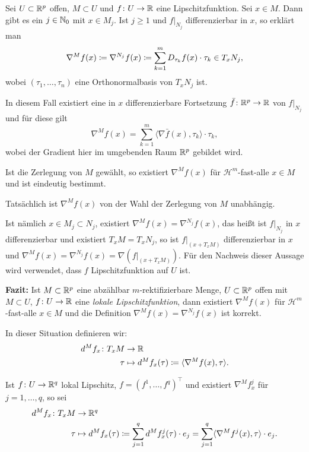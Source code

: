\documentclass[a4paper,twoside,DIV15,BCOR12mm]{scrbook}
\newcommand{\HM}{\mathscr H}
\begin{document}
Sei $U\subset\mathbb{R}^p$ offen, $M\subset U$ und $f\colon U\to \mathbb{R}$ eine Lipschitzfunktion. Sei $x\in M$. Dann gibt es ein $j\in\mathbb{N}_0$ mit $x\in M_j$. Ist $j\ge 1$ und $f|_{N_j}$ differenzierbar in $x$, so erklärt man
\[
\nabla^M f(x) \da \nabla^{N_j} f(x) \da \sum_{k=1}^m  D_{\tau_k}f(x) \cdot \tau_k  \in T_xN_j,
\]
wobei $(\tau_1,\ldots,\tau_n)$ eine Orthonormalbasis von $T_xN_j$ ist.

In diesem Fall existiert eine in $x$ differenzierbare Fortsetzung $\bar f\colon \mathbb{R}^p \to \mathbb{R}$ von $f|_{N_j}$ und für diese gilt 
\[
\nabla^M f(x) = \sum_{k=1}^m \langle \nabla\bar f(x), \tau_k\rangle \cdot \tau_k,
\]
wobei der Gradient hier im umgebenden Raum $\mathbb{R}^p$ gebildet wird.


\begin{bemerkungen}
\item Ist die Zerlegung von $M$ gewählt, so existiert $\nabla^Mf(x)$ für $\HM^m$-fast-alle $x\in M$ und ist eindeutig bestimmt.
\item Tatsächlich ist $\nabla^M f(x)$ von der Wahl der Zerlegung von $M$ unabhängig.

Ist nämlich $x\in M_j\subset N_j$, existiert $\nabla^M f(x) = \nabla^{N_j}f(x)$, das heißt ist $f|_{N_j}$ in $x$ differenzierbar und existiert $T_xM = T_xN_j$, so ist $f|_{(x+T_xM)}$ differenzierbar in $x$ und $\nabla^Mf(x) = \nabla^{N_j} f(x) = \nabla(f|_{(x+T_xM)})$. Für den Nachweis dieser Aussage wird verwendet, dass $f$ Lipschitzfunktion auf $U$ ist.
\end{bemerkungen}

\textbf{Fazit:} Ist $M\subset \mathbb{R}^p$ eine abzählbar $m$-rektifizierbare Menge, $U\subset\mathbb{R}^p$ offen mit $M\subset U$, $f\colon U\to \mathbb{R}$ eine {\em lokale Lipschitzfunktion}, dann existiert $\nabla^Mf(x)$ für $\HM^m$-fast-alle $x\in M$ und die Definition $\nabla^Mf(x) = \nabla^{N_j} f(x)$ ist korrekt. 

In dieser Situation definieren wir:
\begin{align*}
d^M f_x \colon T_xM &\to \MdR \\
\tau &\mapsto d^Mf_x(\tau) \da \langle \nabla^Mf(x), \tau\rangle.
\end{align*}

Ist $f\colon U\to\mathbb{R}^q$ lokal Lipschitz, $f=(f^1,\ldots,f^q)^\top$ und existiert $\nabla^Mf^j_x$ für $j=1,\ldots,q$, so sei 
\begin{align*}
d^M f_x \colon T_xM &\to \MdR^q \\
\tau &\mapsto d^Mf_x(\tau) \da \sum_{j=1}^q d^Mf^j_x(\tau) \cdot e_j = \sum_{j=1}^q \langle \nabla^Mf^j(x), \tau\rangle \cdot e_j.
\end{align*}
\end{document}

